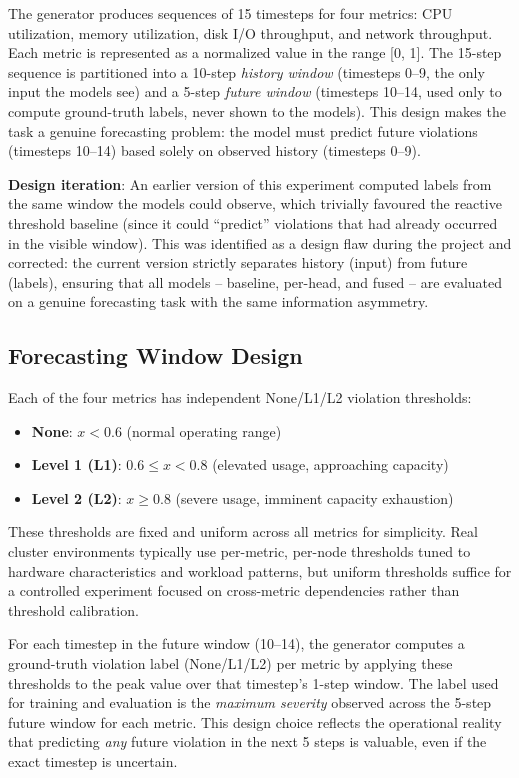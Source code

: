 The generator produces sequences of 15 timesteps for four metrics: CPU utilization, memory utilization, disk I/O throughput, and network throughput. Each metric is represented as a normalized value in the range [0, 1]. The 15-step sequence is partitioned into a 10-step \emph{history window} (timesteps 0--9, the only input the models see) and a 5-step \emph{future window} (timesteps 10--14, used only to compute ground-truth labels, never shown to the models). This design makes the task a genuine forecasting problem: the model must predict future violations (timesteps 10--14) based solely on observed history (timesteps 0--9).

\textbf{Design iteration}: An earlier version of this experiment computed labels from the same window the models could observe, which trivially favoured the reactive threshold baseline (since it could ``predict'' violations that had already occurred in the visible window). This was identified as a design flaw during the project and corrected: the current version strictly separates history (input) from future (labels), ensuring that all models -- baseline, per-head, and fused -- are evaluated on a genuine forecasting task with the same information asymmetry.

\subsection{Forecasting Window Design}
\label{subsec:window}

Each of the four metrics has independent None/L1/L2 violation thresholds:
\begin{itemize}
  \item \textbf{None}: $x < 0.6$ (normal operating range)
  \item \textbf{Level 1 (L1)}: $0.6 \leq x < 0.8$ (elevated usage, approaching capacity)
  \item \textbf{Level 2 (L2)}: $x \geq 0.8$ (severe usage, imminent capacity exhaustion)
\end{itemize}

These thresholds are fixed and uniform across all metrics for simplicity. Real cluster environments typically use per-metric, per-node thresholds tuned to hardware characteristics and workload patterns, but uniform thresholds suffice for a controlled experiment focused on cross-metric dependencies rather than threshold calibration.

For each timestep in the future window (10--14), the generator computes a ground-truth violation label (None/L1/L2) per metric by applying these thresholds to the peak value over that timestep's 1-step window. The label used for training and evaluation is the \emph{maximum severity} observed across the 5-step future window for each metric. This design choice reflects the operational reality that predicting \emph{any} future violation in the next 5 steps is valuable, even if the exact timestep is uncertain.

